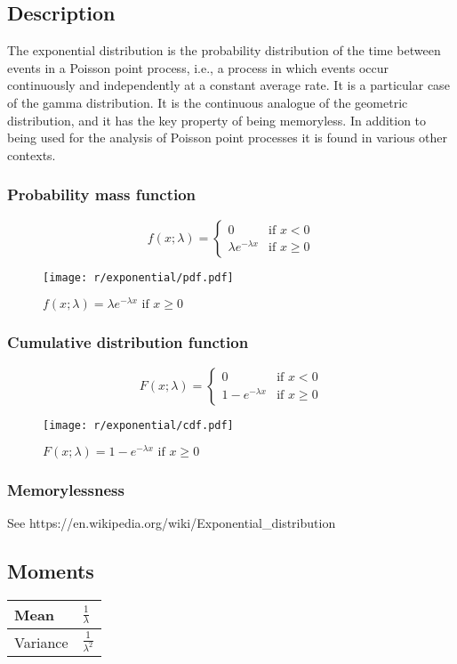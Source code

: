 \subsection{Description}
The exponential distribution is the probability distribution of the time between events in a Poisson point process, i.e., a process in which events occur continuously and independently at a constant average rate. It is a particular case of the gamma distribution. It is the continuous analogue of the geometric distribution, and it has the key property of being memoryless. In addition to being used for the analysis of Poisson point processes it is found in various other contexts.


\subsubsection{Probability mass function}
\[
	f(x; \lambda) =
	\begin{cases}
		0 & \text{if } x < 0 \\
		\lambda e^{-\lambda x} & \text{if } x \geq 0
	\end{cases}
\]

\begin{figure}[H]
	\texttt{[image: r/exponential/pdf.pdf]}
	\caption{$f(x; \lambda) = \lambda e^{-\lambda x} \text{ if } x \geq 0$}
\end{figure}

\subsubsection{Cumulative distribution function}
\[
	F(x; \lambda) =
	\begin{cases}
		0 & \text{if } x < 0 \\
		1 - e^{-\lambda x} & \text{if } x \geq 0
	\end{cases}
\]

\begin{figure}[H]
	\texttt{[image: r/exponential/cdf.pdf]}
	\caption{$F(x; \lambda) = 1 - e^{-\lambda x} \text{ if } x \geq 0$}
\end{figure}

\subsubsection{Memorylessness}
See https://en.wikipedia.org/wiki/Exponential\_distribution

\subsection{Moments}

\begin{tabularx}{\textwidth}{s X}
	\hline
	Mean & $\frac{1}{\lambda}$ \\\hline
	Variance & $\frac{1}{\lambda ^2}$\\\hline
\end{tabularx}


